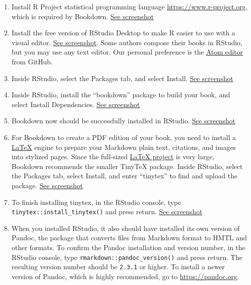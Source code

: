 \documentclass[
  english,
]{book}
\begin{document}
\begin{enumerate}
\def\labelenumi{\arabic{enumi}.}
\item
  Install R Project statistical programming language \url{https://www.r-project.org}, which is required by Bookdown. \href{images/20-bookdown/r-download.png}{See screenshot}
\item
  Install the free version of RStudio Desktop to make R easier to use with a visual editor. \href{images/20-bookdown/rstudio-download.png}{See screenshot}. Some authors compose their books in RStudio, but you may use any text editor. Our personal preference is the \href{https://atom.io/}{Atom editor} from GitHub.
\item
  Inside RStudio, select the Packages tab, and select Install. \href{images/20-bookdown/packages-install.png}{See screenshot}
\item
  Inside RStudio, install the ``bookdown'' package to build your book, and select Install Dependencies. \href{images/20-bookdown/bookdown-install.png}{See screenshot}
\item
  Bookdown now should be successfully installed in RStudio. \href{images/20-bookdown/bookdown-installed.png}{See screenshot}
\item
  For Bookdown to create a PDF edition of your book, you need to install a \href{https://en.wikipedia.org/wiki/LaTeX}{LaTeX} engine to prepare your Markdown plain text, citations, and images into stylized pages. Since the full-sized \href{https://www.latex-project.org/get/}{LaTeX project} is very large, Bookdown recommends the smaller TinyTeX package. Inside RStudio, select the Packages tab, select Install, and enter ``tinytex'' to find and upload the package. \href{images/20-bookdown/tinytex-install.png}{See screenshot}
\item
  To finish installing tinytex, in the RStudio console, type \texttt{tinytex::install\_tinytex()} and press return. \href{images/20-bookdown/tinytex-finish.png}{See screenshot}
\item
  When you installed RStudio, it also should have installed its own version of Pandoc, the package that converts files from Markdown format to HMTL and other formats. To confirm the Pandoc installation and version number, in the RStudio console, type \texttt{rmarkdown::pandoc\_version()} and press return. The resulting version number should be \texttt{2.3.1} or higher. To install a newer version of Pandoc, which is highly recommended, go to \url{https://pandoc.org}.
\end{enumerate}
\end{document}
